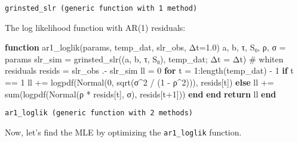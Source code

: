 \documentclass[
  letterpaper,
  DIV=11,
  numbers=noendperiod]{scrartcl}
\newenvironment{Shaded}{\begin{snugshade}}{\end{snugshade}}
\newcommand{\CommentTok}[1]{\textcolor[rgb]{0.37,0.37,0.37}{#1}}
\newcommand{\ControlFlowTok}[1]{\textcolor[rgb]{0.00,0.23,0.31}{\textbf{#1}}}
\newcommand{\FloatTok}[1]{\textcolor[rgb]{0.68,0.00,0.00}{#1}}
\newcommand{\FunctionTok}[1]{\textcolor[rgb]{0.28,0.35,0.67}{#1}}
\newcommand{\KeywordTok}[1]{\textcolor[rgb]{0.00,0.23,0.31}{\textbf{#1}}}
\newcommand{\NormalTok}[1]{\textcolor[rgb]{0.00,0.23,0.31}{#1}}
\newcommand{\OperatorTok}[1]{\textcolor[rgb]{0.37,0.37,0.37}{#1}}
\begin{document}
\begin{verbatim}
grinsted_slr (generic function with 1 method)
\end{verbatim}

The log likelihood function with AR(1) residuals:

\begin{Shaded}
\begin{Highlighting}[]
\KeywordTok{function} \FunctionTok{ar1\_loglik}\NormalTok{(params, temp\_dat, slr\_obs, Δt}\OperatorTok{=}\FloatTok{1.0}\NormalTok{)}
\NormalTok{    a, b, τ, S₀, ρ, σ }\OperatorTok{=}\NormalTok{ params }
\NormalTok{    slr\_sim }\OperatorTok{=} \FunctionTok{grinsted\_slr}\NormalTok{((a, b, τ, S₀), temp\_dat; Δt }\OperatorTok{=}\NormalTok{ Δt)}
    \CommentTok{\# whiten residuals}
\NormalTok{    resids }\OperatorTok{=}\NormalTok{ slr\_obs }\OperatorTok{.{-}}\NormalTok{ slr\_sim}
\NormalTok{    ll }\OperatorTok{=} \FloatTok{0}
    \ControlFlowTok{for}\NormalTok{ t }\OperatorTok{=} \FloatTok{1}\OperatorTok{:}\FunctionTok{length}\NormalTok{(temp\_dat) }\OperatorTok{{-}} \FloatTok{1}
        \ControlFlowTok{if}\NormalTok{ t }\OperatorTok{==} \FloatTok{1}
\NormalTok{            ll }\OperatorTok{+=} \FunctionTok{logpdf}\NormalTok{(}\FunctionTok{Normal}\NormalTok{(}\FloatTok{0}\NormalTok{, }\FunctionTok{sqrt}\NormalTok{(σ}\OperatorTok{\^{}}\FloatTok{2} \OperatorTok{/}\NormalTok{ (}\FloatTok{1} \OperatorTok{{-}}\NormalTok{ ρ}\OperatorTok{\^{}}\FloatTok{2}\NormalTok{))), resids[t])}
        \ControlFlowTok{else}
\NormalTok{            ll }\OperatorTok{+=} \FunctionTok{sum}\NormalTok{(}\FunctionTok{logpdf}\NormalTok{(}\FunctionTok{Normal}\NormalTok{(ρ }\OperatorTok{*}\NormalTok{ resids[t], σ), resids[t}\OperatorTok{+}\FloatTok{1}\NormalTok{]))}
        \ControlFlowTok{end}
    \ControlFlowTok{end} 
    \ControlFlowTok{return}\NormalTok{ ll}
\KeywordTok{end}
\end{Highlighting}
\end{Shaded}

\begin{verbatim}
ar1_loglik (generic function with 2 methods)
\end{verbatim}

Now, let's find the MLE by optimizing the \texttt{ar1\_loglik} function.
\end{document}
